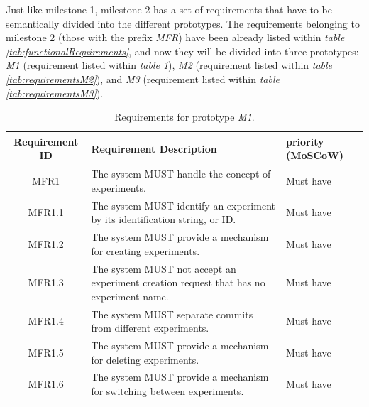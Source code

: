 Just like milestone 1, milestone 2 has a set of requirements that have to be semantically divided into the different prototypes. The requirements belonging
to milestone 2 (those with the prefix \emph{MFR}) have been already listed within \emph{table \ref{tab:functionalRequirements}}, and now they will be divided
into three prototypes: \emph{M1} (requirement listed within \emph{table \ref{tab:requirementsM1}}), \emph{M2} (requirement listed within \emph{table \ref{tab:requirementsM2}}),
and \emph{M3} (requirement listed within \emph{table \ref{tab:requirementsM3}}).

\begin{table}[H]
    \centering
    \begin{tabular}{ | c | p{9cm} | p{3cm} |}
        \hline
        \textbf{Requirement ID} & \textbf{Requirement Description} & \textbf{priority (MoSCoW)} \\ \hline
        MFR1     & The system MUST handle the concept of experiments. & Must have \\ \hline
        MFR1.1   & The system MUST identify an experiment by its identification string, or ID. & Must have \\ \hline
        MFR1.2   & The system MUST provide a mechanism for creating experiments. & Must have \\ \hline
        MFR1.3   & The system MUST not accept an experiment creation request that has no experiment name. & Must have \\ \hline
        MFR1.4   & The system MUST separate commits from different experiments. & Must have \\ \hline
        MFR1.5   & The system MUST provide a mechanism for deleting experiments. & Must have \\ \hline
        MFR1.6   & The system MUST provide a mechanism for switching between experiments. & Must have \\ \hline
    \end{tabular}
    \caption{Requirements for prototype \emph{M1}.}
    \label{tab:requirementsM1}
\end{table}

